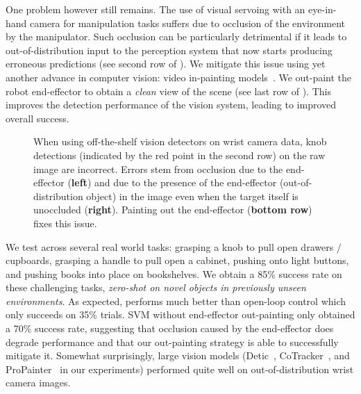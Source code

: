 One problem however still remains. The use of visual servoing with an eye-in-hand
camera for manipulation tasks suffers due
to occlusion of the environment by the manipulator. Such occlusion can be
particularly detrimental if it leads to out-of-distribution input to the
perception system that now starts producing erroneous predictions (see
second row of ). We mitigate this issue using yet another advance in
computer vision: video in-painting models~\cite{chang2023look,
zhou2023propainter, lee2019copy}. We out-paint the robot end-effector to obtain
a \textit{clean} view of the scene (see last row of ). This improves the
detection performance of the vision system, leading to improved overall
success.

\begin{figure}
\setlength{\tabcolsep}{2pt}
\caption{When using off-the-shelf vision detectors on wrist camera data, knob detections (indicated by the {\color{red} red point} in the second row) on the raw image are incorrect. Errors stem from occlusion due to the end-effector ({\bf left}) and due to the presence of the end-effector (out-of-distribution object) in the image even when the target itself is unoccluded ({\bf right}). Painting out the end-effector ({\bf bottom row}) fixes this issue.}
\end{figure}





We test \name across several real world tasks: grasping a knob to pull open
drawers / cupboards, grasping a handle to pull open a cabinet, pushing onto
light buttons, and pushing books into place on bookshelves. We obtain a 
85\% success rate on these challenging tasks, \textit{zero-shot on novel objects
in previously unseen environments}. As expected, \name performs much better than
open-loop control which only succeeds on 35\% trials. SVM without end-effector 
out-painting only obtained a 70\% success rate, suggesting that occlusion
caused by the end-effector does degrade performance and that our out-painting 
strategy is able to successfully mitigate it. Somewhat surprisingly, large vision models (Detic~\cite{zhou2022detecting}, CoTracker~\cite{karaev2023cotracker}, and ProPainter~\cite{zhou2023propainter} in our experiments)
performed quite well on out-of-distribution wrist camera images. 

